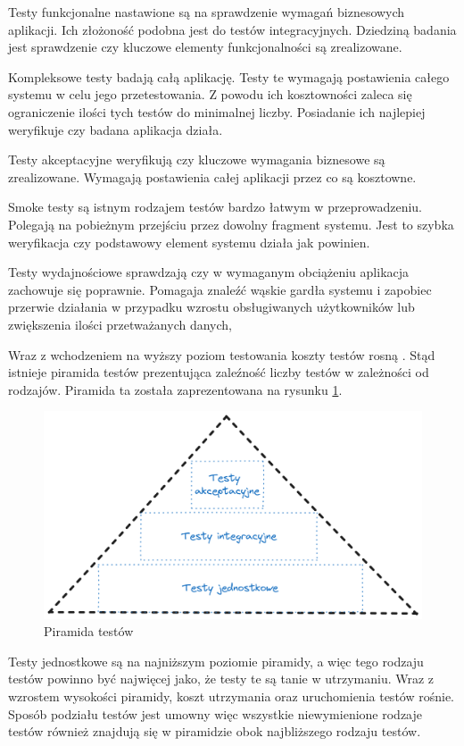 Testy funkcjonalne nastawione są na sprawdzenie wymagań biznesowych aplikacji.
Ich złożoność podobna jest do testów integracyjnych.
Dziedziną badania jest sprawdzenie czy kluczowe elementy funkcjonalności są zrealizowane.

Kompleksowe testy badają całą aplikację.
Testy te wymagają postawienia całego systemu w celu jego przetestowania.
Z powodu ich kosztowności zaleca się ograniczenie ilości tych testów do minimalnej liczby.
Posiadanie ich najlepiej weryfikuje czy badana aplikacja działa.

Testy akceptacyjne weryfikują czy kluczowe wymagania biznesowe są zrealizowane.
Wymagają postawienia całej aplikacji przez co są kosztowne.

Smoke testy są istnym rodzajem testów bardzo łatwym w przeprowadzeniu.
Polegają na pobieżnym przejściu przez dowolny fragment systemu.
Jest to szybka weryfikacja czy podstawowy element systemu działa jak powinien.

Testy wydajnościowe sprawdzają czy w wymaganym obciążeniu aplikacja zachowuje się poprawnie.
Pomagaja znaleźć wąskie gardła systemu i zapobiec przerwie działania w przypadku wzrostu obsługiwanych użytkowników lub zwiększenia ilości przetważanych danych,

Wraz z wchodzeniem na wyższy poziom testowania koszty testów rosną \cite{testerzyPiramidaTestw}.
Stąd istnieje piramida testów prezentująca zaleźność liczby testów w zależności od rodzajów.
Piramida ta została zaprezentowana na rysunku \ref{rys:test-pyramid}.
\begin{figure}[!hb]
	\centering \includegraphics[width=1\linewidth]{rysunki/test-pyramid.png}
	\caption{Piramida testów}
	\label{rys:test-pyramid}
\end{figure}
Testy jednostkowe są na najniższym poziomie piramidy, a więc tego rodzaju testów powinno być najwięcej jako, że testy te są tanie w utrzymaniu.
Wraz z wzrostem wysokości piramidy, koszt utrzymania oraz uruchomienia testów rośnie.
Sposób podziału testów jest umowny więc wszystkie niewymienione rodzaje testów również znajdują się w piramidzie obok najbliższego rodzaju testów.


